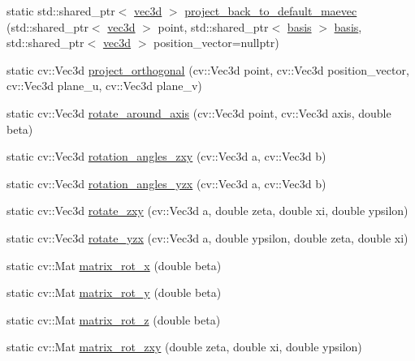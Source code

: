\begin{DoxyCompactItemize}
\item 
static std\-::shared\-\_\-ptr$<$ \hyperlink{classmae_1_1math_1_1vec3d}{vec3d} $>$ \hyperlink{classmae_1_1math_1_1math_a5c6a6f6cde0e3d90d3b6b453e2fe5da9}{project\-\_\-back\-\_\-to\-\_\-default\-\_\-maevec} (std\-::shared\-\_\-ptr$<$ \hyperlink{classmae_1_1math_1_1vec3d}{vec3d} $>$ point, std\-::shared\-\_\-ptr$<$ \hyperlink{classmae_1_1math_1_1basis}{basis} $>$ \hyperlink{classmae_1_1math_1_1basis}{basis}, std\-::shared\-\_\-ptr$<$ \hyperlink{classmae_1_1math_1_1vec3d}{vec3d} $>$ position\-\_\-vector=nullptr)
\item 
static cv\-::\-Vec3d \hyperlink{classmae_1_1math_1_1math_a2c4227d6a43b7a45d4285a079d9d6e85}{project\-\_\-orthogonal} (cv\-::\-Vec3d point, cv\-::\-Vec3d position\-\_\-vector, cv\-::\-Vec3d plane\-\_\-u, cv\-::\-Vec3d plane\-\_\-v)
\item 
static cv\-::\-Vec3d \hyperlink{classmae_1_1math_1_1math_a957eca4941bff614fd36e02013091e59}{rotate\-\_\-around\-\_\-axis} (cv\-::\-Vec3d point, cv\-::\-Vec3d axis, double beta)
\item 
static cv\-::\-Vec3d \hyperlink{classmae_1_1math_1_1math_aff17eeb2d30632c7fa0dae6e4e4c85c4}{rotation\-\_\-angles\-\_\-zxy} (cv\-::\-Vec3d a, cv\-::\-Vec3d b)
\item 
static cv\-::\-Vec3d \hyperlink{classmae_1_1math_1_1math_af52aaef0bcb8e0000233d51eec68f7fb}{rotation\-\_\-angles\-\_\-yzx} (cv\-::\-Vec3d a, cv\-::\-Vec3d b)
\item 
static cv\-::\-Vec3d \hyperlink{classmae_1_1math_1_1math_a48444501fb7cce0eaf99aee4207f680c}{rotate\-\_\-zxy} (cv\-::\-Vec3d a, double zeta, double xi, double ypsilon)
\item 
static cv\-::\-Vec3d \hyperlink{classmae_1_1math_1_1math_a8400ff6d79fb7ff9675e0b6cbf53b7d1}{rotate\-\_\-yzx} (cv\-::\-Vec3d a, double ypsilon, double zeta, double xi)
\item 
static cv\-::\-Mat \hyperlink{classmae_1_1math_1_1math_af32162d01a4c9671f795413465653b8f}{matrix\-\_\-rot\-\_\-x} (double beta)
\item 
static cv\-::\-Mat \hyperlink{classmae_1_1math_1_1math_a4f4997976691b38222874d170bee59d5}{matrix\-\_\-rot\-\_\-y} (double beta)
\item 
static cv\-::\-Mat \hyperlink{classmae_1_1math_1_1math_a243d901ca79c76772d3c8cf975cab08e}{matrix\-\_\-rot\-\_\-z} (double beta)
\item 
static cv\-::\-Mat \hyperlink{classmae_1_1math_1_1math_a3b4c1beb6b911a7403b8c98ab4fb7460}{matrix\-\_\-rot\-\_\-zxy} (double zeta, double xi, double ypsilon)

\end{DoxyCompactItemize}
